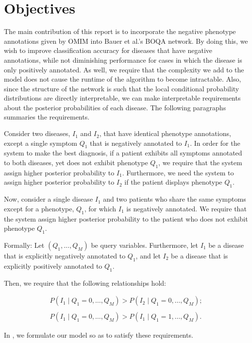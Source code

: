 \section{Objectives}
\label{sec:obj}

The main contribution of this report is to incorporate the negative phenotype
annotations given by OMIM \cite{hamosh2005online} into
Bauer et al.'s \cite{bauer2012bayesian} BOQA network.
By doing this, we wish to improve classification accuracy for diseases that
have negative annotations, while not diminishing performance for cases in which
the disease is only positively annotated.
As well, we require that the complexity we add to the model does not cause the
runtime of the algorithm to become intractable.
%
Also, since the structure of the network is such that the local conditional
probability distributions are directly interpretable, we can make interpretable
requirements about the posterior probabilities of each disease. 
The following paragraphs summaries the requirements.

Consider two diseases, $I_1$ and $I_2$, that have identical phenotype
annotations, except a single symptom $Q_1$ that is negatively annotated to $I_1$.
In order for the system to make the best diagnosis, if a patient exhibits all
symptoms annotated to both diseases, yet does not exhibit phenotype $Q_1$, we
require that the system assign higher posterior probability to $I_1$.
Furthermore, we need the system to assign higher posterior probability to $I_2$
if the patient displays phenotype $Q_1$.

Now, consider a single disease $I_1$ and two patients who share the same symptoms
except for a phenotype, $Q_1$, for which $I_1$ is negatively annotated. We require that
the system assign higher posterior probability to the patient who does not
exhibit phenotype $Q_1$.

Formally:
%
Let $(Q_1, ..., Q_M)$ be query variables.
Furthermore,
let $I_1$ be a disease that is explicitly negatively annotated to $Q_1$, and
let $I_2$ be a disease that is explicitly positively annotated to $Q_1$.

Then, we require that the following relationships hold:

\vspace{0.1cm}
\begin{align*}
    P(I_1 \mid Q_1 = 0, \hdots, Q_M) >
    P(I_2 \mid Q_1 = 0, \hdots, Q_M); \\\\
    P(I_1 \mid Q_1 = 0, \hdots, Q_M) >
    P(I_1 \mid Q_1 = 1, \hdots, Q_M).
\end{align*}
\vspace{0.1cm}

In , we formulate our model so as to satisfy these requirements.

